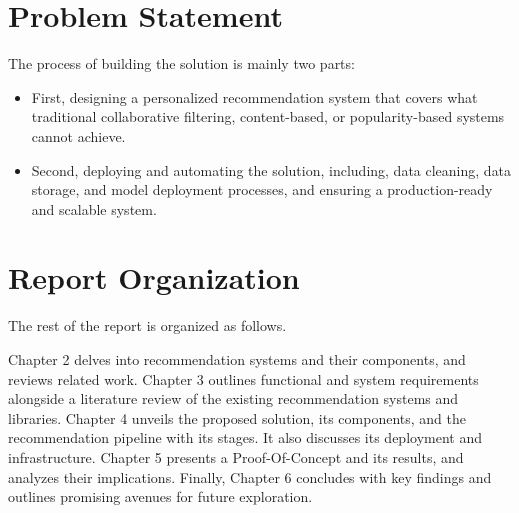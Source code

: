 \section{Problem Statement}

The process of building the solution is mainly two parts:

\begin{itemize}
    \item First, designing a personalized recommendation system that covers what traditional collaborative filtering, content-based, or popularity-based systems cannot achieve.
    \item Second, deploying and automating the solution, including, data cleaning, data storage, and model deployment processes, and ensuring a production-ready and scalable system.
\end{itemize}
\section{Report Organization}

The rest of the report is organized as follows. 

Chapter 2 delves into recommendation systems and their components, and reviews related work. 
Chapter 3 outlines functional and system requirements alongside 
a literature review of the existing
recommendation systems and libraries. Chapter 4 unveils the proposed solution, 
its components, and the recommendation pipeline with its stages. 
It also discusses its deployment and infrastructure. 
Chapter 5 presents a Proof-Of-Concept and its results, and analyzes their implications. 
Finally, Chapter 6 
concludes with key findings and outlines promising avenues for 
future exploration.